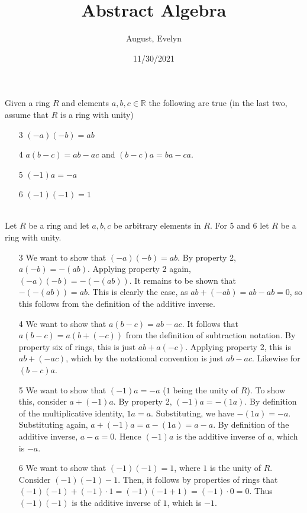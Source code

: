 \documentclass{article}
\title{Abstract Algebra}
\author{August, Evelyn}
\date{11/30/2021}
\newcommand{\R}{\mathbb{R}}
\begin{document}
\maketitle

 Given a ring $R$ and elements $a,b,c\in \R$ the following are true (in the last two, assume that $R$ is a ring with unity)
\begin{enumerate}
    \item[3] $(-a)(-b) = ab$
    \item[4] $a(b-c) = ab - ac$ and $(b-c)a = ba- ca$.
    \item[5] $(-1)a = -a$
    \item[6] $(-1)(-1) = 1$
\end{enumerate}\\

Let $R$ be a ring and let $a,b,c$ be arbitrary elements in $R$. For 5 and 6 let $R$  be a ring with unity.
\begin{enumerate}

    \item[3] We want to show that $(-a)(-b) = ab$. By property 2, $a(-b) = -(ab)$. Applying property 2 again, $(-a)(-b) = -(-(ab)).$ It remains to be shown that $-(-(ab)) = ab$. This is clearly the case, as $ab + (-ab) = ab - ab = 0$, so this follows from the definition of the additive inverse.\\
    
    \item[4] We want to show that $a(b-c) = ab - ac$. It follows that $a(b-c) = a(b + (-c))$ from the definition of subtraction notation. By property six of rings, this is just $ab + a(-c)$. Applying property 2, this is $ab + (-ac)$, which by the notational convention is just $ab - ac$. Likewise for $(b-c)a$.\\
    
    \item[5] We want to show that $(-1)a = -a$ ($1$ being the unity of $R$). To show this, consider $a + (-1)a$. By property 2, $(-1)a = -(1a)$. By definition of the multiplicative identity, $ 1a = a$. Substituting, we have $-(1a) = -a$. Substituting again, $a + (-1)a = a - (1a) = a- a$. By definition of the additive inverse, $ a - a = 0$. Hence $(-1)a$ is the additive inverse of $a$, which is $-a$.\\
    
    \item[6] We want to show that $(-1)(-1) = 1$, where $1$ is the unity of $R$. Consider $(-1)(-1)-1$. Then, it follows by properties of rings that $(-1)(-1)+(-1)\cdot1=(-1)(-1+1)=(-1)\cdot0=0$. Thus $(-1)(-1)$ is the additive inverse of $1$, which is $-1$. \\
    
\end{enumerate}\\
\end{document}
